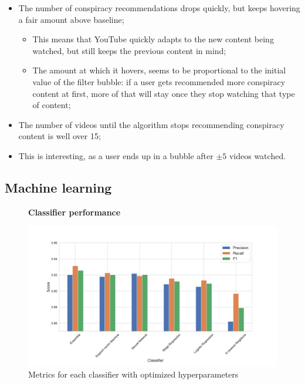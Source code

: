 \documentclass[../main.tex]{subfiles}
\begin{document}
\begin{itemize}
    \item The number of conspiracy recommendations drops quickly, but keeps hovering a fair amount above baseline;
    \begin{itemize}
        \item This means that YouTube quickly adapts to the new content being watched, but still keeps the previous content in mind;
        \item The amount at which it hovers, seems to be proportional to the initial value of the filter bubble: if a user gets recommended more conspiracy content at first, more of that will stay once they stop watching that type of content; 
    \end{itemize}
    \item The number of videos until the algorithm stops recommending conspiracy content is well over 15;
    \item This is interesting, as a user ends up in a bubble after $\pm 5$ videos watched.
\end{itemize}

\subsection{Machine learning}

\begin{figure}[ht]
  \textbf{Classifier performance}\par\medskip
  \centering
  \includegraphics[keepaspectratio, width=\textwidth]{images/classifier_results.pdf}
  \caption{Metrics for each classifier with optimized hyperparameters}
  \label{fig:ML_scores}
\end{figure}
\end{document}
